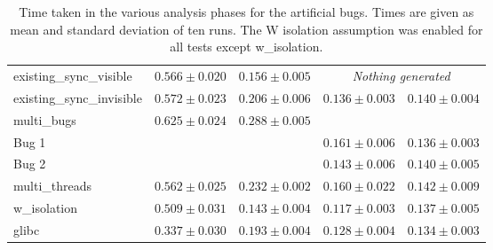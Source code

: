 \begin{sidewaystable}
\begin{tabular}{lllll}
    existing\_sync\_visible        & $0.566 \pm 0.020$ &  $0.156 \pm 0.005$ & \multicolumn{2}{c}{\emph{Nothing generated}} \\
    existing\_sync\_invisible      & $0.572 \pm 0.023$ &  $0.206 \pm 0.006$ &  $0.136 \pm 0.003$ &  $0.140 \pm 0.004$\\
    multi\_bugs                    & $0.625 \pm 0.024$ &  $0.288 \pm 0.005$ & \\
    \hspace{5mm}Bug 1 & & &  $0.161 \pm 0.006$ &  $0.136 \pm 0.003$\\
    \hspace{5mm}Bug 2 & & &  $0.143 \pm 0.006$ &  $0.140 \pm 0.005$\\
    multi\_threads                 & $0.562 \pm 0.025$ &  $0.232 \pm 0.002$ &  $0.160 \pm 0.022$ &  $0.142 \pm 0.009$\\
    w\_isolation                   & $0.509 \pm 0.031$ &  $0.143 \pm 0.004$ &  $0.117 \pm 0.003$ &  $0.137 \pm 0.005$\\
    glibc                          & $0.337 \pm 0.030$ &  $0.193 \pm 0.004$ &  $0.128 \pm 0.004$ &  $0.134 \pm 0.003$\\
  \end{tabular}
  \caption{Time taken in the various analysis phases for the
    artificial bugs.  Times are given as mean and standard deviation
    of ten runs.  The W isolation assumption was enabled for all tests
    except w\_isolation.}
  \label{table:eval:summary_analysis_times}
\end{sidewaystable}

